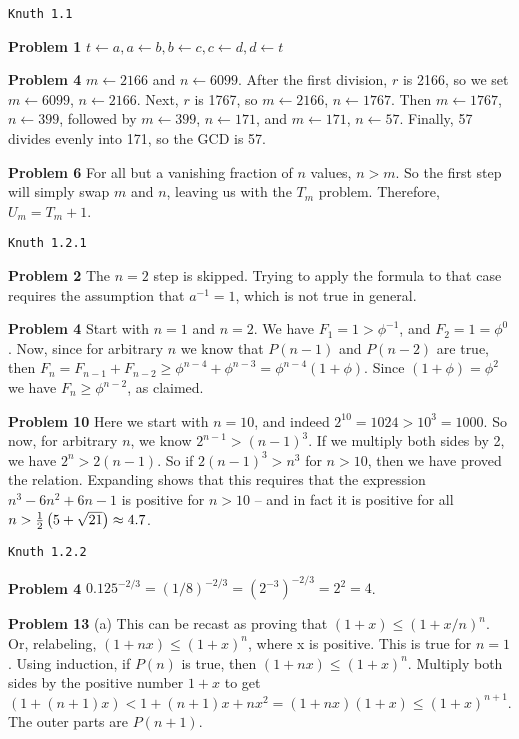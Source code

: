\topglue 0.5in
\centerline{\tt Knuth 1.1}
\vskip 0.3in

\noindent
{\bf Problem 1} $t \leftarrow a, a \leftarrow b, b \leftarrow c, c \leftarrow d, d \leftarrow t$

\vskip 0.1in
\noindent
{\bf Problem 4} $m \leftarrow 2166$ and $n \leftarrow 6099$.  After the first division, $r$ is 
2166, so we set $m \leftarrow 6099$, $n \leftarrow 2166$.  Next, $r$ is 1767, so 
$m \leftarrow 2166$, $n \leftarrow 1767$.  Then $m \leftarrow 1767$, $n \leftarrow 399$,
followed by $m \leftarrow 399$, $n \leftarrow 171$, and $m \leftarrow 171$, $n\leftarrow 57$.
Finally, 57 divides evenly into 171, so the GCD is 57.

\vskip 0.1in
\noindent
{\bf Problem 6} For all but a vanishing fraction of $n$ values, $n > m$.  So the first step
will simply swap $m$ and $n$, leaving us with the $T_m$ problem.  Therefore, $U_m = T_m+1$.

\vskip 0.5in
\centerline{\tt Knuth 1.2.1}
\vskip 0.3in

\noindent
{\bf Problem 2} The $n=2$ step is skipped.  Trying to apply the formula to that case
 requires the assumption that $a^{-1} = 1$, which is not true in general.

\vskip 0.1in
\noindent
{\bf Problem 4}  Start with $n=1$ and $n=2$.  We have $F_1 = 1 > \phi^{-1}$, 
 and $F_2 = 1 = \phi^0$.  Now, since for arbitrary $n$ we know that $P\left(n-1\right)$
 and $P\left(n-2\right)$ are true, then $F_n = F_{n-1}+F_{n-2} \ge \phi^{n-4} + \phi^{n-3}
 = \phi^{n-4} \left(1 + \phi\right)$.  Since $\left(1 + \phi\right) = \phi^2$
 we have $F_n \ge \phi^{n-2}$, as claimed.

\vskip 0.1in
\noindent
{\bf Problem 10} Here we start with $n=10$, and indeed $2^{10} = 1024 > 10^3 = 1000$.
 So now, for arbitrary $n$, we know $2^{n-1} > \left(n-1\right)^3$.  If we multiply
 both sides by 2, we have $2^n > 2 \left(n-1\right)$.  So if $2 \left(n-1\right)^3 > n^3$
 for $n > 10$, then we have proved the relation.  Expanding shows that this requires
 that the expression $n^3 - 6 n^2 + 6n - 1$ is positive for $n > 10$ -- and in fact
 it is positive for all $n > {1 \over 2} \left( 5 + \sqrt{21} \right) \approx 4.7$.

\vskip 0.5in
\centerline{\tt Knuth 1.2.2}
\vskip 0.3in

\noindent
{\bf Problem 4} $0.125^{-2/3} = \left(1/8\right)^{-2/3} = \left(2^{-3}\right)^{-2/3} = 2^{2} = 4$.

\vskip 0.1in
\noindent
{\bf Problem 13} (a) This can be recast as proving that 
  $\left(1+x\right) \le \left(1 + x/n\right)^n$.
  Or, relabeling, $\left(1+n x \right) \le \left(1+x\right)^n$, where x is positive.  This
  is true for $n=1$.  Using induction, if $P\left(n\right)$ is true, then $\left(1+n x \right) \le
  \left(1+x\right)^n$.  Multiply both sides by the positive number $1+x$ to get
  $ \left( 1 + \left(n+1\right) x \right) < 1 + \left(n+1\right) x + n x^2 = 
  \left(1+n x\right) \left(1 + x\right) \le \left(1+x\right)^{n+1}$.  The outer parts are
  $P\left(n+1\right)$.
  
